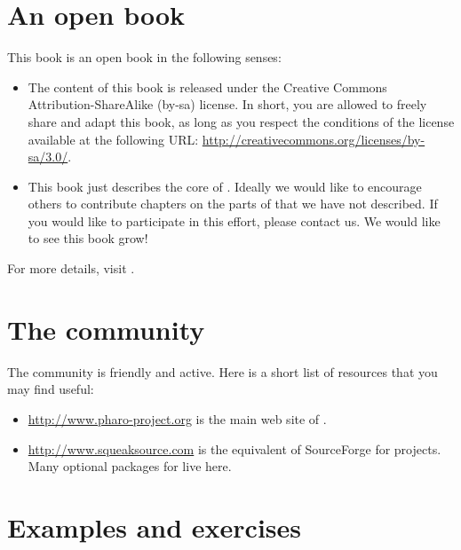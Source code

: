 \documentclass[a4paper,10pt,twoside]{book}
\begin{document}
\section*{An open book}

This book is an open book in the following senses: 

\begin{itemize}

\item	The content of this book is released under the Creative Commons Attribution-ShareAlike (by-sa) license.
		In short, you are allowed to freely share and adapt this book, as long as you respect the conditions of the license available at the following URL: 
		\url{http://creativecommons.org/licenses/by-sa/3.0/}.

\item	This book just describes the core of \pharo.
		Ideally we would like to encourage others to contribute chapters
		on the parts of \pharo that we have not described.
		If you would like to participate in this effort, please
		contact us.  We would like to see this book grow!
\end{itemize}

For more details, visit \pbe.

\section*{The \pharo community}

The \pharo community is friendly and active.
Here is a short list of resources that you may find useful:

\begin{itemize}
\item \url{http://www.pharo-project.org} is the main web site of \pharo.

\item \url{http://www.squeaksource.com} is the equivalent of SourceForge for \pharo projects.
Many optional packages for \pharo live here.
\end{itemize}

\section*{Examples and exercises}
\end{document}
